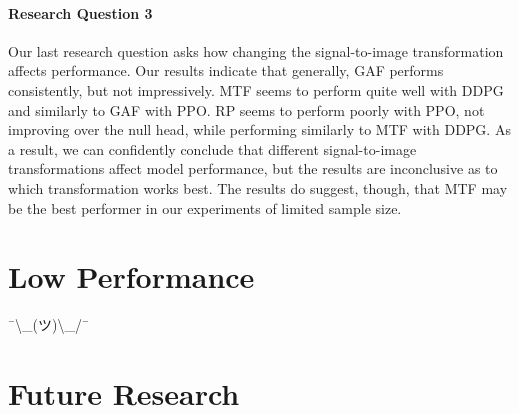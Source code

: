 \paragraph{Research Question 3}
Our last research question asks how changing the signal-to-image transformation affects performance.
Our results indicate that generally, GAF performs consistently, but not impressively.
MTF seems to perform quite well with DDPG and similarly to GAF with PPO.
RP seems to perform poorly with PPO, not improving over the null head, while performing similarly to MTF with DDPG.
As a result, we can confidently conclude that different signal-to-image transformations affect model performance, but the results are inconclusive as to which transformation works best.
The results do suggest, though, that MTF may be the best performer in our experiments of limited sample size.

\section{Low Performance}
¯\textbackslash\_(ツ)\textbackslash\_/¯

\section{Future Research}



